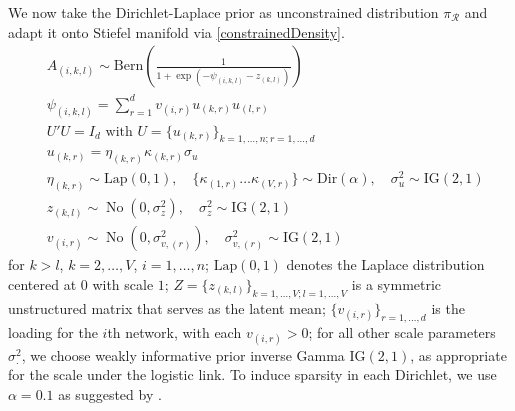 \documentclass[10pt,fleqn]{article}
\newcommand{\mc}[1]{\mathcal{#1}}
\DeclareMathOperator{\No}{No}
\DeclareMathOperator{\1}{\mathbbm{1}}
\begin{document}
We now
take the Dirichlet-Laplace prior \citep{bhattacharya2015dirichlet} as unconstrained distribution
$\pi_{\mc R}$ and adapt it onto Stiefel manifold via \eqref{constrainedDensity}.
   \begin{equation*}
   \begin{aligned}
   & A_{(i,k,l)} \sim \text{Bern}( \frac{1}{1+ \exp(-\psi_{(i,k,l)}- z_{(k,l)})})\\
   & \psi_{(i,k,l)} = \sum_{r=1}^{d}  v_{(i,r)} u_{(k,r)} u_{(l,r)}  \\
   & U'U=I_{d} \text{ with } U=\{u_{(k,r)}\}_{k=1,\ldots,n; r=1,\ldots,d}\\
           & u_{(k,r)}= \eta_{(k,r)}\kappa_{(k,r)}\sigma_{u} \\
   & \eta_{(k,r)}\sim \text{Lap}(0,1), \quad \{\kappa_{(1,r)}\ldots \kappa_{(V,r)}\} \sim \text{Dir}(\alpha),
    \quad \sigma^2_{u}\sim \text{IG}(2,1)\\   
   & z_{(k,l)} \sim \No(0,\sigma^2_z), \quad  \sigma^2_z \sim \text{IG}(2,1)
   \\
   & v_{(i,r)} \sim \No(0,\sigma^2_{v,(r)}), \quad  \sigma^2_{v,(r)} \sim \text{IG}(2,1)
   \end{aligned}
   \end{equation*}
   for $k>l$, $k=2,\ldots, V$, $i=1,\ldots,n$;  $\text{Lap}(0,1)$ denotes
   the Laplace distribution centered at $0$ with scale $1$; $Z=\{z_{(k,l)}\}_{k=1,\ldots,V;l=1,\ldots,V}$ is a symmetric unstructured matrix that serves as the latent mean; $\{ v_{(i,r)}\}_{r=1,\ldots,d}$
is the loading for the $i$th network, with each $v_{(i,r)}>0$; for all other scale parameters $\sigma^2_.$, we
choose weakly informative prior inverse Gamma $\text{IG}(2,1)$, as appropriate for the scale under the logistic link. To induce sparsity in each Dirichlet,
we use $\alpha=0.1$ as suggested by 
\cite{bhattacharya2015dirichlet}.
\end{document}
